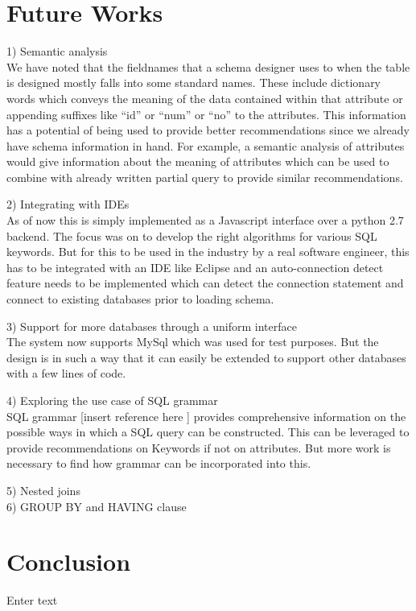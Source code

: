\documentclass{acm_proc_article-sp}
\begin{document}
\section{Future Works}
1) Semantic analysis \\
We have noted that the fieldnames that a schema designer uses to when the table is designed mostly falls into some standard names. These include dictionary words which conveys the meaning of the data contained within that attribute or appending suffixes like ``id'' or ``num'' or ``no'' to the attributes. This information has a potential of being used to provide better recommendations since we already have schema information in hand. For example, a semantic analysis of attributes would give information about the meaning of attributes which can be used to combine with already written partial query to provide similar recommendations.  

2) Integrating with IDEs\\
As of now this is simply implemented as a Javascript interface over a python 2.7 backend. The focus was on to develop the right algorithms for various SQL keywords. But for this to be used in the industry by a real software engineer, this has to be integrated with an IDE like Eclipse and an auto-connection detect feature needs to be implemented which can detect the connection statement and connect to existing databases prior to loading schema. 

3) Support for more databases through a uniform interface \\
The system now supports MySql which was used for test purposes. But the design is in such a way that it can easily be extended to support other databases with a few lines of code. 

4) Exploring the use case of SQL grammar\\
SQL grammar [insert reference here ] provides comprehensive information on the possible ways in which a SQL query can be constructed. This can be leveraged to provide recommendations on Keywords if not on attributes.  But more work is necessary to find how grammar can be incorporated into this. 

5) Nested joins\\

6) GROUP BY and HAVING clause\\



\section{Conclusion}
Enter text
\end{document}

